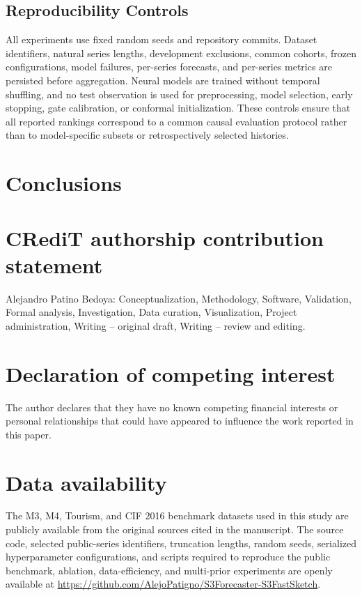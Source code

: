 \documentclass[review,number,sort&compress]{elsarticle}
\begin{document}
\subsection{Reproducibility Controls}
\label{subsec:reproducibility}

All experiments use fixed random seeds and repository commits. Dataset identifiers, natural series lengths, development exclusions, common cohorts, frozen configurations, model failures, per-series forecasts, and per-series metrics are persisted before aggregation. Neural models are trained without temporal shuffling, and no test observation is used for preprocessing, model selection, early stopping, gate calibration, or conformal initialization. These controls ensure that all reported rankings correspond to a common causal evaluation protocol rather than to model-specific subsets or retrospectively selected histories.



\section{Conclusions}






\section*{CRediT authorship contribution statement}

Alejandro Patino Bedoya:
Conceptualization,
Methodology,
Software,
Validation,
Formal analysis,
Investigation,
Data curation,
Visualization,
Project administration,
Writing -- original draft,
Writing -- review and editing.

\section*{Declaration of competing interest}

The author declares that they have no known competing financial
interests or personal relationships that could have appeared to
influence the work reported in this paper.

\section*{Data availability}

The M3, M4, Tourism, and CIF 2016 benchmark datasets used in this
study are publicly available from the original sources cited in the
manuscript. The source code, selected public-series identifiers,
truncation lengths, random seeds, serialized hyperparameter
configurations, and scripts required to reproduce the public benchmark,
ablation, data-efficiency, and multi-prior experiments are openly
available at \url{https://github.com/AlejoPatigno/S3Forecaster-S3FastSketch}.
\end{document}
